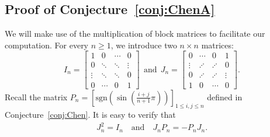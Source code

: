\documentclass[11pt,reqno]{amsart}
\numberwithin{equation}{section}
\theoremstyle{plain}
\theoremstyle{definition}
\def\sgn{\mathrm{sgn}}
\def\t{\text}
\begin{document}
\subsection{Proof of Conjecture~\ref{conj:ChenA}}
We will make use of the multiplication of block matrices to facilitate our computation. For every $n\ge 1$, we introduce two $n\times n$ matrices:
$$I_n=\begin{bmatrix}
1 & 0 & \cdots & 0\\
0 & \ddots & \ddots & \vdots\\
\vdots & \ddots & \ddots & 0\\
0 & \cdots & 0 & 1
\end{bmatrix}\ \ \text{and}\ \
J_n=\begin{bmatrix}
0 & \cdots & 0 & 1\\
\vdots & \iddots & \iddots & 0\\
0 & \iddots & \iddots & \vdots\\
1 & 0 & \cdots & 0
\end{bmatrix}.$$
Recall the matrix $P_n=[\sgn(\sin(\frac{i+j}{n+1}\pi))]_{1\le i,j\le n}$ defined in Conjecture~\ref{conj:Chen}. It is easy to verify that
\begin{align}
\label{id:IJP}
J_n^2=I_n\quad \t{and}\quad J_nP_n=-P_nJ_n.
\end{align}
\end{document}
